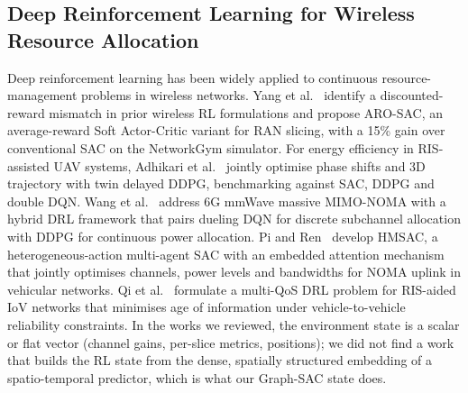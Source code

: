 \subsection{Deep Reinforcement Learning for Wireless Resource Allocation}
Deep reinforcement learning has been widely applied to continuous resource-management problems in wireless networks. Yang et al.~\cite{yang2024aro} identify a discounted-reward mismatch in prior wireless RL formulations and propose ARO-SAC, an average-reward Soft Actor-Critic variant for RAN slicing, with a 15\% gain over conventional SAC on the NetworkGym simulator. For energy efficiency in RIS-assisted UAV systems, Adhikari et al.~\cite{adhikari2024} jointly optimise phase shifts and 3D trajectory with twin delayed DDPG, benchmarking against SAC, DDPG and double DQN. Wang et al.~\cite{wang2024} address 6G mmWave massive MIMO-NOMA with a hybrid DRL framework that pairs dueling DQN for discrete subchannel allocation with DDPG for continuous power allocation. Pi and Ren~\cite{pi2024} develop HMSAC, a heterogeneous-action multi-agent SAC with an embedded attention mechanism that jointly optimises channels, power levels and bandwidths for NOMA uplink in vehicular networks. Qi et al.~\cite{qi2024} formulate a multi-QoS DRL problem for RIS-aided IoV networks that minimises age of information under vehicle-to-vehicle reliability constraints. In the works we reviewed, the environment state is a scalar or flat vector (channel gains, per-slice metrics, positions); we did not find a work that builds the RL state from the dense, spatially structured embedding of a spatio-temporal predictor, which is what our Graph-SAC state does.

